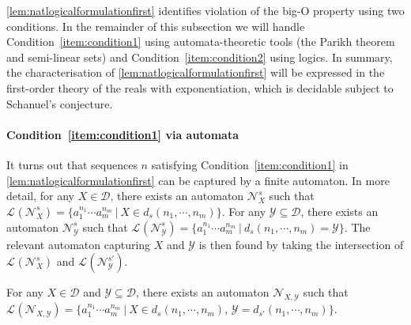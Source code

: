 \documentclass{lmcs}
\theoremstyle{plain}
\theoremstyle{definition}
\theoremstyle{remark}
\newcommand\lng[2]{\mathcal{L}_{#1}(#2)}
\newcommand\dgf{d}
\newcommand\adm{\mathcal{D}}
\begin{document}
\cref{lem:natlogicalformulationfirst} identifies violation of the big-O property using two conditions. In the remainder of this subsection we will handle  Condition~\ref{item:condition1} using automata-theoretic tools (the Parikh theorem and semi-linear sets) and Condition~\ref{item:condition2} using logics. In summary, the characterisation of \cref{lem:natlogicalformulationfirst} will be expressed in the first-order theory of the reals with exponentiation, which is decidable subject to Schanuel's conjecture.

\paragraph*{Condition~\ref{item:condition1} via automata}

It turns out that sequences $n$ satisfying Condition~\ref{item:condition1} in \cref{lem:natlogicalformulationfirst} can be captured by a finite automaton.  In more detail, for any  $X\in \mathcal{D}$, there exists an automaton $\mathcal{N}^s_{X}$ such that
$\lng{}{\mathcal{N}^s_{X}} = \{ a_1^{n_1}\cdots a_m^{n_m} \ | \ X\in \dgf_s(n_1,\cdots,n_m) \}$. For any $\mathcal{Y}\subseteq \mathcal{D}$, there exists an automaton $\mathcal{N}^s_{\mathcal{Y}}$ such that
$\lng{}{\mathcal{N}^s_{\mathcal{Y}}} = \{ a_1^{n_1}\cdots a_m^{n_m} \ | \ \dgf_s(n_1,\cdots,n_m) = \mathcal{Y} \}$. The relevant automaton capturing $X$ and $\mathcal{Y}$ is then found by taking  the intersection of $\lng{}{\mathcal{N}^s_{{X}}}$ and $\lng{}{\mathcal{N}^{s'}_{\mathcal{Y}}}$.
\begin{lem} \label{lem:detectors}
For any $X\in\adm$ and $\mathcal{Y}\subseteq\adm$, there exists an automaton $\mathcal{N}_{X,\mathcal{Y}}$ such that
$\lng{}{\mathcal{N}_{X,\mathcal{Y}}} = \{ a_1^{n_1}\cdots a_m^{n_m}\ |\  X\in \dgf_s(n_1,\cdots,n_m),\, \mathcal{Y} = \dgf_{s'}(n_1,\cdots, n_m) \}$.
\end{lem}
\end{document}
